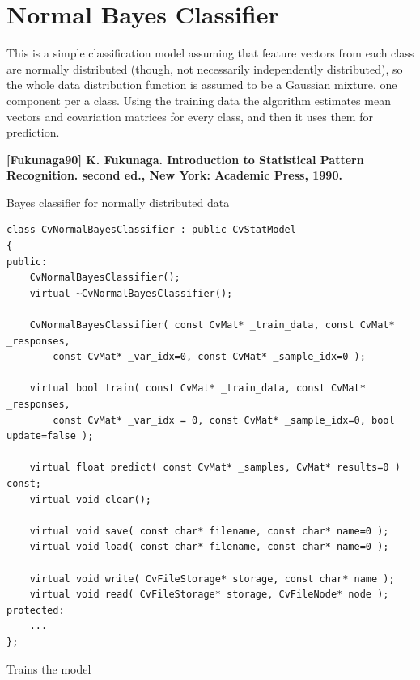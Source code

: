 \section{Normal Bayes Classifier}

This is a simple classification model assuming that feature vectors from each class are normally distributed (though, not necessarily independently distributed), so the whole data distribution function is assumed to be a Gaussian mixture, one component per a class. Using the training data the algorithm estimates mean vectors and covariation matrices for every class, and then it uses them for prediction.

\textbf{[Fukunaga90] K. Fukunaga. Introduction to Statistical Pattern Recognition. second ed., New York: Academic Press, 1990.}



Bayes classifier for normally distributed data

\begin{lstlisting}
class CvNormalBayesClassifier : public CvStatModel
{
public:
    CvNormalBayesClassifier();
    virtual ~CvNormalBayesClassifier();

    CvNormalBayesClassifier( const CvMat* _train_data, const CvMat* _responses,
        const CvMat* _var_idx=0, const CvMat* _sample_idx=0 );

    virtual bool train( const CvMat* _train_data, const CvMat* _responses,
        const CvMat* _var_idx = 0, const CvMat* _sample_idx=0, bool update=false );

    virtual float predict( const CvMat* _samples, CvMat* results=0 ) const;
    virtual void clear();

    virtual void save( const char* filename, const char* name=0 );
    virtual void load( const char* filename, const char* name=0 );

    virtual void write( CvFileStorage* storage, const char* name );
    virtual void read( CvFileStorage* storage, CvFileNode* node );
protected:
    ...
};
\end{lstlisting}




Trains the model


